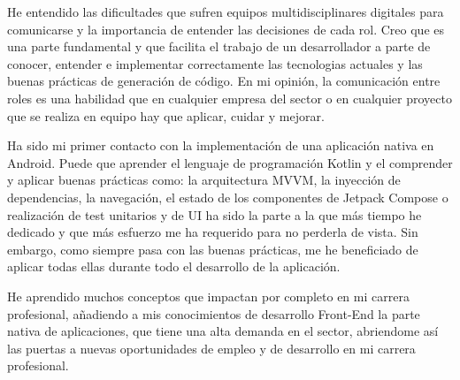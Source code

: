 He entendido las dificultades que sufren equipos multidisciplinares digitales para comunicarse y la importancia de entender las decisiones de cada rol. Creo que es una parte fundamental y que facilita el trabajo de un desarrollador a parte de conocer, entender e implementar correctamente las tecnologias actuales y las buenas prácticas de generación de código. En mi opinión, la comunicación entre roles es una habilidad que en cualquier empresa del sector o en cualquier proyecto que se realiza en equipo hay que aplicar, cuidar y mejorar.

Ha sido mi primer contacto con la implementación de una aplicación nativa en Android. Puede que aprender el lenguaje de programación Kotlin y el comprender y aplicar buenas prácticas como: la arquitectura MVVM, la inyección de dependencias, la navegación, el estado de los componentes de Jetpack Compose o realización de test unitarios y de UI ha sido la parte a la que más tiempo he dedicado y que más esfuerzo me ha requerido para no perderla de vista. Sin embargo, como siempre pasa con las buenas prácticas, me he beneficiado de aplicar todas ellas durante todo el desarrollo de la aplicación.

He aprendido muchos conceptos que impactan por completo en mi carrera profesional, añadiendo a mis conocimientos de desarrollo Front-End la parte nativa de aplicaciones, que tiene una alta demanda en el sector, abriendome así las puertas a nuevas oportunidades de empleo y de desarrollo en mi carrera profesional.